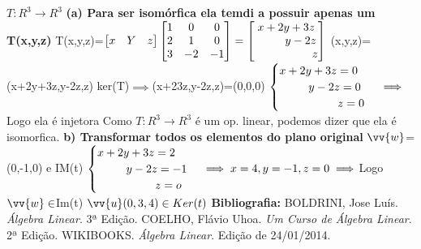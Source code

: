 \documentclass[11pt,a4paper]{article}
\newcommand\taba[1][2.55cm]{\hspace*{#1}}
\begin{document}
\begin{flushleft}
\taba $T:R^3\rightarrow R^3$\linebreak
\taba \textbf{ (a) Para ser isomórfica ela temdi a possuir apenas um T(x,y,z)}
\taba T(x,y,z)=$\begin{bmatrix}
x & Y & z
\end{bmatrix} \begin{bmatrix}
1&0&0\\
2&1&0\\
3&-2&-1
\end{bmatrix} =\begin{bmatrix}
x+2y+3z\\
 \hspace{9mm}y-2z\\
 \hspace{18mm}z
\end{bmatrix}
$\linebreak
\taba(x,y,z)=(x+2y+3z,y-2z,z)\linebreak
\taba ker(T)$\implies$(x+23z,y-2z,z)=(0,0,0)\linebreak
\taba $\begin{cases}
x+2y+3z=0\\
\hspace{9mm}y-2z=0\\
\hspace{18mm}z=0
\end{cases}\implies$ Logo ela é injetora\linebreak
\taba Como $T:R^3\rightarrow R^3$ é um op. linear, podemos dizer que ela é isomorfica.\linebreak
\newline
\taba \textbf{b) Transformar todos os elementos do plano original}\linebreak
\taba $\vv{w}$=(0,-1,0) e IM(t)\linebreak
\taba $\begin{cases}
x+2y+3z=2\\
\hspace{9mm}y-2z=-1\\
\hspace{18mm}z=o
\end{cases}\implies x=4, y=-1, z=0 \implies
$Logo $\vv{w}\in$Im(t)\linebreak
\taba \textbf{$\vv{u}(0,3,4)\in Ker(t)$}\linebreak
\newline
%
%
\textbf{Bibliografia: }BOLDRINI, Jose Luís. \textit{Álgebra Linear}. 3ª Edição. \linebreak
\taba COELHO, Flávio Uhoa. \textit{Um Curso de Álgebra Linear}. 2ª Edição.
\taba WIKIBOOKS. \textit{Álgebra Linear}. Edição de 24/01/2014. \linebreak

\end{flushleft}
\end{document}
